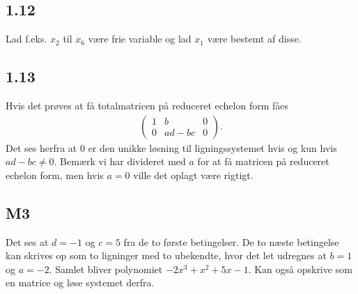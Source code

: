 		\subsection{1.12} 

			Lad f.eks. $x_2$ til $x_6$ være frie variable og lad $x_1$ være bestemt af disse.

		\subsection{1.13}

			Hvis det prøves at få totalmatricen på reduceret echelon form fåes
				\begin{align*}
					\left(\begin{array}{cc|c} {1} & {b} & {0} \\ {0} & {ad-bc} & {0} \end{array}\right).
				\end{align*} 
			Det ses herfra at $0$ er den unikke løsning til ligningssystemet hvis og kun hvis $ad-bc\neq 0$. Bemærk vi har divideret med $a$ for at få matricen på reduceret echelon form, men hvis $a=0$ ville det oplagt være rigtigt.

		\subsection{M3}

			Det ses at $d=-1$ og $c=5$ fra de to første betingelser. De to næste betingelse kan skrives op som to ligninger med to ubekendte, hvor det let udregnes at $b=1$ og $a=-2$. Samlet bliver polynomiet $-2x^3+x^2+5x-1$. Kan også opskrive som en matrice og løse systemet derfra.

















